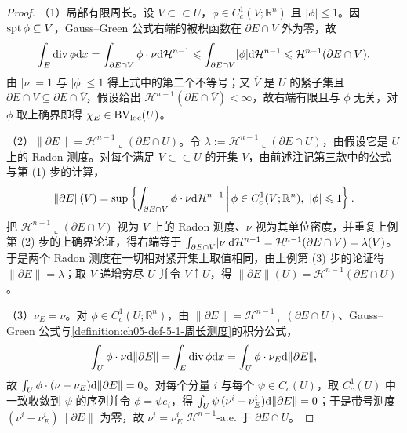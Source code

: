 \documentclass[../../main.tex]{subfiles}%
\begin{document}
\begin{proof}
（1）局部有限周长。设 $V\subset\subset U$，$\phi\in C_c^1(V;\mathbb{R}^n)$ 且 $\lvert\phi\rvert\leqslant1$。因 $\operatorname{spt}\phi\subseteq V$，Gauss--Green 公式右端的被积函数在 $\partial E\cap V$ 外为零，故
\begin{align*}
\int_E\operatorname{div}\phi\mathrm{d} x=\int_{\partial E\cap V}\phi\cdot\nu\mathrm{d}\mathcal{H}^{n-1}\leqslant\int_{\partial E\cap V}\lvert\phi\rvert\mathrm{d}\mathcal{H}^{n-1}\leqslant\mathcal{H}^{n-1}(\partial E\cap V).
\end{align*}
由 $\lvert\nu\rvert=1$ 与 $\lvert\phi\rvert\leqslant1$ 得上式中的第二个不等号；又 $\overline{V}$ 是 $U$ 的紧子集且 $\partial E\cap V\subseteq\partial E\cap\overline{V}$，假设给出 $\mathcal{H}^{n-1}(\partial E\cap\overline{V})<\infty$，故右端有限且与 $\phi$ 无关，对 $\phi$ 取上确界即得 $\chi_E\in\mathrm{BV}_{\mathrm{loc}}(U)$。

（2）$\lVert\partial E\rVert=\mathcal{H}^{n-1}\llcorner(\partial E\cap U)$。令 $\lambda:=\mathcal{H}^{n-1}\llcorner(\partial E\cap U)$，由假设它是 $U$ 上的 Radon 测度。对每个满足 $V\subset\subset U$ 的开集 $V$，由\hyperref[remark:ch05-def-5-1-范数]{前述注记}第三款中的公式与第 (1) 步的计算，
\begin{align*}
\lVert\partial E\rVert(V)=\sup\left\{\int_{\partial E\cap V}\phi\cdot\nu\mathrm{d}\mathcal{H}^{n-1}\,\middle|\,\phi\in C_c^1(V;\mathbb{R}^n),\ \lvert\phi\rvert\leqslant1\right\}.
\end{align*}
把 $\mathcal{H}^{n-1}\llcorner(\partial E\cap V)$ 视为 $V$ 上的 Radon 测度、$\nu$ 视为其单位密度，并重复上例第 (2) 步的上确界论证，得右端等于 $\int_{\partial E\cap V}\lvert\nu\rvert\mathrm{d}\mathcal{H}^{n-1}=\mathcal{H}^{n-1}(\partial E\cap V)=\lambda(V)$。于是两个 Radon 测度在一切相对紧开集上取值相同，由上例第 (3) 步的论证得 $\lVert\partial E\rVert=\lambda$；取 $V$ 递增穷尽 $U$ 并令 $V\uparrow U$，得 $\lVert\partial E\rVert(U)=\mathcal{H}^{n-1}(\partial E\cap U)$。

（3）$\nu_E=\nu$。对 $\phi\in C_c^1(U;\mathbb{R}^n)$，由 $\lVert\partial E\rVert=\mathcal{H}^{n-1}\llcorner(\partial E\cap U)$、Gauss--Green 公式与\cref{definition:ch05-def-5-1-周长测度}的积分公式，%
\begin{align*}
\int_U\phi\cdot\nu\mathrm{d}\lVert\partial E\rVert=\int_E\operatorname{div}\phi\mathrm{d} x=\int_U\phi\cdot\nu_E\mathrm{d}\lVert\partial E\rVert,
\end{align*}
故 $\int_U\phi\cdot(\nu-\nu_E)\mathrm{d}\lVert\partial E\rVert=0$。对每个分量 $i$ 与每个 $\psi\in C_c(U)$，取 $C_c^1(U)$ 中一致收敛到 $\psi$ 的序列并令 $\phi=\psi e_i$，得 $\int_U\psi\,(\nu^i-\nu_E^i)\mathrm{d}\lVert\partial E\rVert=0$；于是带号测度 $(\nu^i-\nu_E^i)\lVert\partial E\rVert$ 为零，故 $\nu^i=\nu_E^i$ $\mathcal{H}^{n-1}$-a.e. 于 $\partial E\cap U$。


\end{proof}
\end{document}
